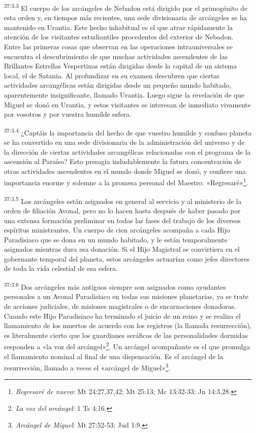 \par
\textsuperscript{37:3.3} El cuerpo de los arcángeles de Nebadon está dirigido por el primogénito de esta orden y, en tiempos más recientes, una sede divisionaria de arcángeles se ha mantenido en Urantia. Este hecho inhabitual es el que atrae rápidamente la atención de los visitantes estudiantiles procedentes del exterior de Nebadon. Entre las primeras cosas que observan en las operaciones intrauniversales se encuentra el descubrimiento de que muchas actividades ascendentes de las Brillantes Estrellas Vespertinas están dirigidas desde la capital de un sistema local, el de Satania. Al profundizar en su examen descubren que ciertas actividades arcangélicas están dirigidas desde un pequeño mundo habitado, aparentemente insignificante, llamado Urantia. Luego sigue la revelación de que Miguel se donó en Urantia, y estos visitantes se interesan de inmediato vivamente por vosotros y por vuestra humilde esfera.

\par
\textsuperscript{37:3.4} ¿Captáis la importancia del hecho de que vuestro humilde y confuso planeta se ha convertido en una sede divisionaria de la administración del universo y de la dirección de ciertas actividades arcangélicas relacionadas con el programa de la ascensión al Paraíso? Esto presagia indudablemente la futura concentración de otras actividades ascendentes en el mundo donde Miguel se donó, y confiere una importancia enorme y solemne a la promesa personal del Maestro: «Regresaré»\footnote{\textit{Regresaré de nuevo}: Mt 24:27,37,42; Mt 25:13; Mc 13:32-33; Jn 14:3,28.}.

\par
\textsuperscript{37:3.5} Los arcángeles están asignados en general al servicio y al ministerio de la orden de filiación Avonal, pero no lo hacen hasta después de haber pasado por una extensa formación preliminar en todas las fases del trabajo de los diversos espíritus ministrantes. Un cuerpo de cien arcángeles acompaña a cada Hijo Paradisiaco que se dona en un mundo habitado, y le están temporalmente asignados mientras dura esa donación. Si el Hijo Magistral se convirtiera en el gobernante temporal del planeta, estos arcángeles actuarían como jefes directores de toda la vida celestial de esa esfera.

\par
\textsuperscript{37:3.6} Dos arcángeles más antiguos siempre son asignados como ayudantes personales a un Avonal Paradisiaco en todas sus misiones planetarias, ya se trate de acciones judiciales, de misiones magistrales o de encarnaciones donadoras. Cuando este Hijo Paradisiaco ha terminado el juicio de un reino y se realiza el llamamiento de los muertos de acuerdo con los registros (la llamada resurrección), es literalmente cierto que los guardianes seráficos de las personalidades dormidas responden a «la voz del arcángel»\footnote{\textit{La voz del arcángel}: 1 Ts 4:16.}. Un arcángel acompañante es el que promulga el llamamiento nominal al final de una dispensación. Es el arcángel de la resurrección, llamado a veces el «arcángel de Miguel»\footnote{\textit{Arcángel de Miguel}: Mt 27:52-53; Jud 1:9.}.

